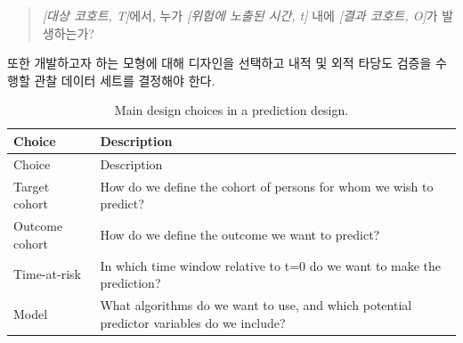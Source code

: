 \documentclass[11pt]{book}
\theoremstyle{definition}
\theoremstyle{definition}
\theoremstyle{definition}
\theoremstyle{remark}
\begin{document}
\begin{quote}
\emph{{[}대상 코호트, T{]}}에서, 누가 \emph{{[}위험에 노출된 시간, t{]}}
내에 \emph{{[}결과 코호트, O{]}}가 발생하는가?
\end{quote}

또한 개발하고자 하는 모형에 대해 디자인을 선택하고 내적 및 외적 타당도
검증을 수행할 관찰 데이터 세트를 결정해야 한다.

\begin{longtable}[]{@{}ll@{}}
\caption{\label{tab:plpDesign} Main design choices in a prediction
design.}\tabularnewline
\toprule
\begin{minipage}[b]{0.23\columnwidth}\raggedright\strut
Choice\strut
\end{minipage} & \begin{minipage}[b]{0.71\columnwidth}\raggedright\strut
Description\strut
\end{minipage}\tabularnewline
\midrule
\endfirsthead
\toprule
\begin{minipage}[b]{0.23\columnwidth}\raggedright\strut
Choice\strut
\end{minipage} & \begin{minipage}[b]{0.71\columnwidth}\raggedright\strut
Description\strut
\end{minipage}\tabularnewline
\midrule
\endhead
\begin{minipage}[t]{0.23\columnwidth}\raggedright\strut
Target cohort\strut
\end{minipage} & \begin{minipage}[t]{0.71\columnwidth}\raggedright\strut
How do we define the cohort of persons for whom we wish to
predict?\strut
\end{minipage}\tabularnewline
\begin{minipage}[t]{0.23\columnwidth}\raggedright\strut
Outcome cohort\strut
\end{minipage} & \begin{minipage}[t]{0.71\columnwidth}\raggedright\strut
How do we define the outcome we want to predict?\strut
\end{minipage}\tabularnewline
\begin{minipage}[t]{0.23\columnwidth}\raggedright\strut
Time-at-risk\strut
\end{minipage} & \begin{minipage}[t]{0.71\columnwidth}\raggedright\strut
In which time window relative to t=0 do we want to make the
prediction?\strut
\end{minipage}\tabularnewline
\begin{minipage}[t]{0.23\columnwidth}\raggedright\strut
Model\strut
\end{minipage} & \begin{minipage}[t]{0.71\columnwidth}\raggedright\strut
What algorithms do we want to use, and which potential predictor
variables do we include?\strut
\end{minipage}\tabularnewline
\bottomrule
\end{longtable}
\end{document}
